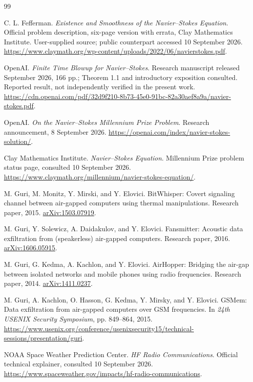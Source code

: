 \documentclass[11pt,a4paper]{article}
\theoremstyle{definition}
\theoremstyle{remark}
\begin{document}
\begin{thebibliography}{99}
\raggedright
{}
C. L. Fefferman. \emph{Existence and Smoothness of the Navier--Stokes Equation}. Official problem description, six-page version with errata, Clay Mathematics Institute. User-supplied source; public counterpart accessed 10 September 2026. \url{https://www.claymath.org/wp-content/uploads/2022/06/navierstokes.pdf}.

OpenAI. \emph{Finite Time Blowup for Navier--Stokes}. Research manuscript released September 2026, 166 pp.; Theorem 1.1 and introductory exposition consulted. Reported result, not independently verified in the present work. \url{https://cdn.openai.com/pdf/32d9f210-8b73-45e0-91bc-82a30aef8a9a/navier-stokes.pdf}.

OpenAI. \emph{On the Navier--Stokes Millennium Prize Problem}. Research announcement, 8 September 2026. \url{https://openai.com/index/navier-stokes-solution/}.

Clay Mathematics Institute. \emph{Navier--Stokes Equation}. Millennium Prize problem status page, consulted 10 September 2026. \url{https://www.claymath.org/millennium/navier-stokes-equation/}.

M. Guri, M. Monitz, Y. Mirski, and Y. Elovici. BitWhisper: Covert signaling channel between air-gapped computers using thermal manipulations. Research paper, 2015. \href{https://arxiv.org/abs/1503.07919}{arXiv:1503.07919}.

M. Guri, Y. Solewicz, A. Daidakulov, and Y. Elovici. Fansmitter: Acoustic data exfiltration from (speakerless) air-gapped computers. Research paper, 2016. \href{https://arxiv.org/abs/1606.05915}{arXiv:1606.05915}.

M. Guri, G. Kedma, A. Kachlon, and Y. Elovici. AirHopper: Bridging the air-gap between isolated networks and mobile phones using radio frequencies. Research paper, 2014. \href{https://arxiv.org/abs/1411.0237}{arXiv:1411.0237}.

M. Guri, A. Kachlon, O. Hasson, G. Kedma, Y. Mirsky, and Y. Elovici. GSMem: Data exfiltration from air-gapped computers over GSM frequencies. In \emph{24th USENIX Security Symposium}, pp. 849--864, 2015. \url{https://www.usenix.org/conference/usenixsecurity15/technical-sessions/presentation/guri}.

NOAA Space Weather Prediction Center. \emph{HF Radio Communications}. Official technical explainer, consulted 10 September 2026. \url{https://www.spaceweather.gov/impacts/hf-radio-communications}.


\end{thebibliography}
\end{document}
